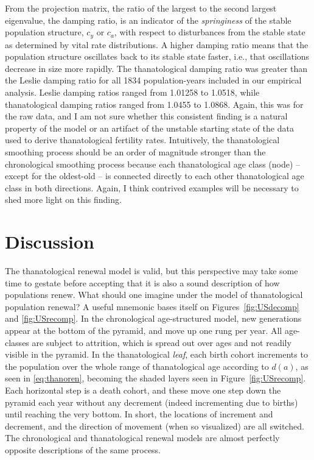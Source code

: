 \documentclass{article}
\begin{document}
From the projection matrix, the ratio of the largest to the second largest
eigenvalue, the damping ratio, is an indicator of the \textit{springiness} of
the stable population structure, $c_y$ or $c_a$, with respect to disturbances from the stable state
as determined by vital rate distributions. A higher damping ratio means that the
population structure oscillates back to its stable state faster, i.e., that
oscillations decrease in size more rapidly. The thanatological damping ratio was
greater than the Leslie damping ratio for all 1834 population-years included in
our empirical analysis. Leslie damping ratios ranged from 1.01258 to 1.0518,
while thanatological damping ratios ranged from 1.0455 to 1.0868. Again, this
was for the raw data, and I am not sure whether this consistent finding is a
natural property of the model or an artifact of the unstable starting state of
the data used to derive thanatological fertility rates. Intuitively, the
thanatological smoothing process should be an order of magnitude stronger than
the chronological smoothing process because each thanatological age class
(node) -- except for the oldest-old -- is connected directly to each other
thanatological age class in both directions. Again, I think contrived examples
will be necessary to shed more light on this finding.

\section{Discussion}
The thanatological renewal model is valid, but this perspective may take some
time to gestate before accepting that it is also a sound description of how
populations renew. What should one imagine under the model of thanatological
population renewal? A useful mnemonic bases itself on Figures~\ref{fig:USdecomp}
and \ref{fig:USrecomp}. In the chronological age-structured model, new
generations appear at the bottom of the pyramid, and move up one rung per year.
All age-classes are subject to attrition, which is spread out over ages and not
readily visible in the pyramid. In the thanatological \textit{leaf}, each birth cohort increments to the population over the whole range of thanatological age
according to $d(a)$, as seen in \eqref{eq:thanoren}, becoming the
shaded layers seen in Figure~\ref{fig:USrecomp}. Each horizontal step is a death
cohort, and these move one step down the pyramid each year without any decrement
(indeed incrementing due to births) until reaching the very bottom. In short,
the locations of increment and decrement, and the direction of movement (when
so visualized) are all switched. The chronological and thanatological renewal
models are almost perfectly opposite descriptions of the same process. 
\end{document}
